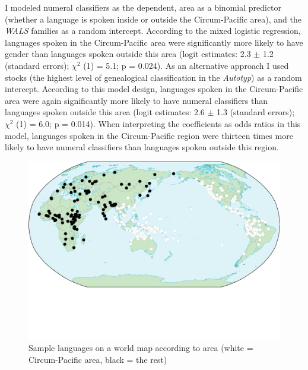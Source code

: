 \documentclass[output=collectionpaper]{langsci/langscibook}
\begin{document}
I modeled numeral classifiers as the dependent, area as a binomial predictor (whether a language is spoken inside or outside the Circum-Pacific area), and the \textit{WALS} families as a random intercept. According to the mixed logistic regression, languages spoken in the Circum-Pacific area were significantly more likely to have gender than languages spoken outside this area (logit estimates: 2.3 $\pm$ 1.2 (standard errors); $\chi^2$ (1) = 5.1; p = 0.024). As an alternative approach I used stocks (the highest level of genealogical classification in the \textit{Autotyp}) as a random intercept. According to this model design, languages spoken in the Circum-Pacific area were again significantly more likely to have numeral classifiers than languages spoken outside this area (logit estimates: 2.6 $\pm$ 1.3 (standard errors); $\chi^2$ (1) = 6.0; p = 0.014). When interpreting the coefficients as odds ratios in this model, languages spoken in the Circum-Pacific region were thirteen times more likely to have numeral classifiers than languages spoken outside this region.

\begin{figure}
\includegraphics[width=\textwidth]{figures/13/Fig4_MapCircumPacific_s}
\caption{Sample languages on a world map according to area (white = Circum-Pacific area, black = the rest)}
\label{fig:Sinne:4}
\end{figure}
\end{document}
